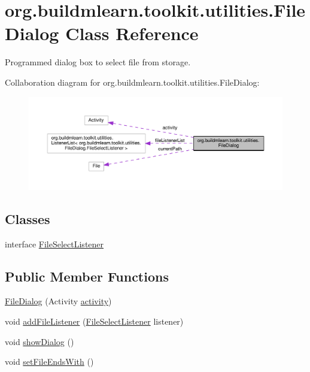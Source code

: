 \hypertarget{classorg_1_1buildmlearn_1_1toolkit_1_1utilities_1_1FileDialog}{}\section{org.\+buildmlearn.\+toolkit.\+utilities.\+File\+Dialog Class Reference}
\label{classorg_1_1buildmlearn_1_1toolkit_1_1utilities_1_1FileDialog}


Programmed dialog box to select file from storage.  




Collaboration diagram for org.\+buildmlearn.\+toolkit.\+utilities.\+File\+Dialog\+:
\nopagebreak
\begin{figure}[H]
\begin{center}
\leavevmode
\includegraphics[width=350pt]{classorg_1_1buildmlearn_1_1toolkit_1_1utilities_1_1FileDialog__coll__graph}
\end{center}
\end{figure}
\subsection*{Classes}
\begin{DoxyCompactItemize}
\item 
interface \hyperlink{interfaceorg_1_1buildmlearn_1_1toolkit_1_1utilities_1_1FileDialog_1_1FileSelectListener}{File\+Select\+Listener}
\end{DoxyCompactItemize}
\subsection*{Public Member Functions}
\begin{DoxyCompactItemize}
\item 
\hyperlink{classorg_1_1buildmlearn_1_1toolkit_1_1utilities_1_1FileDialog_a98eda9195dc2e46af7e8822032586aa9}{File\+Dialog} (Activity \hyperlink{classorg_1_1buildmlearn_1_1toolkit_1_1utilities_1_1FileDialog_a145f83bf45ccc4012513d57f1d95301f}{activity})
\item 
void \hyperlink{classorg_1_1buildmlearn_1_1toolkit_1_1utilities_1_1FileDialog_a2b4eb4aba65bab023377964ed059f288}{add\+File\+Listener} (\hyperlink{interfaceorg_1_1buildmlearn_1_1toolkit_1_1utilities_1_1FileDialog_1_1FileSelectListener}{File\+Select\+Listener} listener)
\item 
void \hyperlink{classorg_1_1buildmlearn_1_1toolkit_1_1utilities_1_1FileDialog_ada706f71f2afdcb8b8469f4821ca572a}{show\+Dialog} ()
\item 
void \hyperlink{classorg_1_1buildmlearn_1_1toolkit_1_1utilities_1_1FileDialog_a0b250b8085a226f3a5614dab96a06802}{set\+File\+Ends\+With} ()
\end{DoxyCompactItemize}
